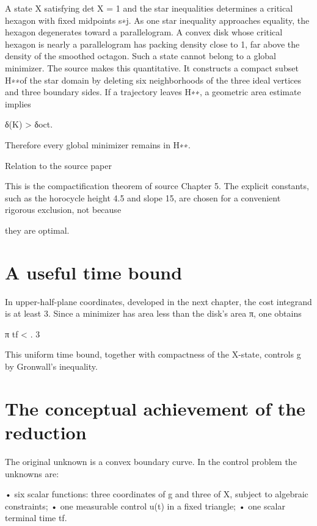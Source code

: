 A state X satisfying det X = 1 and the star inequalities determines a critical hexagon with fixed midpoints s∗j. As one star inequality approaches equality, the hexagon degenerates toward a parallelogram. A convex disk whose critical hexagon is nearly a parallelogram has packing density close to 1, far above the density of the smoothed octagon. Such a state cannot belong to a global minimizer. The source makes this quantitative. It constructs a compact subset H∗∗of the star domain by deleting six neighborhoods of the three ideal vertices and three boundary sides. If a trajectory leaves H∗∗, a geometric area estimate implies


\begin{displaytext}
δ(K) > δoct.
\end{displaytext}

Therefore every global minimizer remains in H∗∗.


\begin{insightbox}{Relation to the source paper}
\end{insightbox}

This is the compactification theorem of source Chapter 5. The explicit constants, such as the horocycle height 4.5 and slope 15, are chosen for a convenient rigorous exclusion, not because


they are optimal.


\section{A useful time bound}

In upper-half-plane coordinates, developed in the next chapter, the cost integrand is at least 3. Since a minimizer has area less than the disk’s area π, one obtains


π tf < . 3


This uniform time bound, together with compactness of the X-state, controls g by Gronwall’s inequality.


\section{The conceptual achievement of the reduction}

The original unknown is a convex boundary curve. In the control problem the unknowns are:


• six scalar functions: three coordinates of g and three of X, subject to algebraic constraints; • one measurable control u(t) in a fixed triangle; • one scalar terminal time tf.


